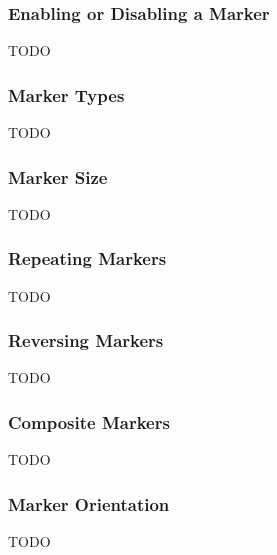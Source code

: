 \subsubsection{Enabling or Disabling a Marker}\label{sec:enablingmarkers}

TODO


\subsubsection{Marker Types}\label{sec:markertypes}


TODO


\subsubsection{Marker Size}\label{sec:markersize}


TODO


\subsubsection{Repeating Markers}\label{sec:repeatingmarkers}


TODO


\subsubsection{Reversing Markers}\label{sec:reversingmarkers}


TODO


\subsubsection{Composite Markers}\label{sec:compositemarkers}


TODO


\subsubsection{Marker Orientation}\label{sec:markerorientation}


TODO


